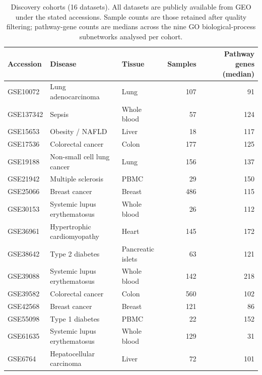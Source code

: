 \documentclass[twocolumn,10pt,letterpaper]{article}
\begin{document}









\begin{table}[t]
\centering
\caption{Discovery cohorts (16 datasets). All datasets are publicly available from GEO
under the stated accessions. Sample counts are those retained after quality filtering;
pathway-gene counts are medians across the nine GO biological-process subnetworks
analysed per cohort.}
\label{tab:datasets}
\normalsize
\begin{tabular}{lllrr}
\toprule
Accession & Disease & Tissue & Samples & Pathway genes (median) \\
\midrule
GSE10072 & Lung adenocarcinoma & Lung & 107 & 91 \\
GSE137342 & Sepsis & Whole blood & 57 & 124 \\
GSE15653 & Obesity / NAFLD & Liver & 18 & 117 \\
GSE17536 & Colorectal cancer & Colon & 177 & 125 \\
GSE19188 & Non-small cell lung cancer & Lung & 156 & 137 \\
GSE21942 & Multiple sclerosis & PBMC & 29 & 150 \\
GSE25066 & Breast cancer & Breast & 486 & 115 \\
GSE30153 & Systemic lupus erythematosus & Whole blood & 26 & 112 \\
GSE36961 & Hypertrophic cardiomyopathy & Heart & 145 & 172 \\
GSE38642 & Type 2 diabetes & Pancreatic islets & 63 & 121 \\
GSE39088 & Systemic lupus erythematosus & Whole blood & 142 & 218 \\
GSE39582 & Colorectal cancer & Colon & 560 & 102 \\
GSE42568 & Breast cancer & Breast & 121 & 86 \\
GSE55098 & Type 1 diabetes & PBMC & 22 & 152 \\
GSE61635 & Systemic lupus erythematosus & Whole blood & 129 & 31 \\
GSE6764 & Hepatocellular carcinoma & Liver & 72 & 101 \\
\bottomrule
\end{tabular}
\end{table}
\end{document}
